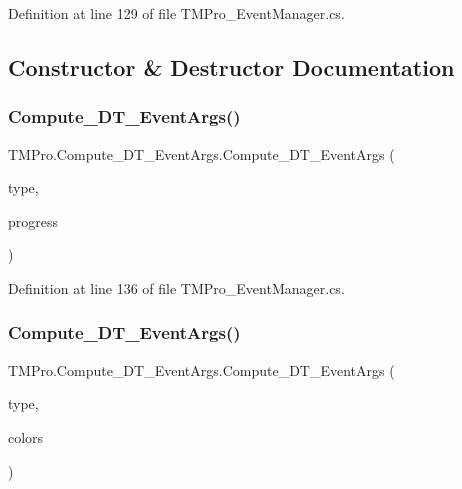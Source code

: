 Definition at line 129 of file T\+M\+Pro\+\_\+\+Event\+Manager.\+cs.



\subsection{Constructor \& Destructor Documentation}
\mbox{\label{class_t_m_pro_1_1_compute___d_t___event_args_ad8c2efb977ea8e6e15815ced2257af5d}} 
\subsubsection{\texorpdfstring{Compute\_DT\_EventArgs()}{Compute\_DT\_EventArgs()}\hspace{0.1cm}{\footnotesize\ttfamily [1/2]}}
{\footnotesize\ttfamily T\+M\+Pro.\+Compute\+\_\+\+D\+T\+\_\+\+Event\+Args.\+Compute\+\_\+\+D\+T\+\_\+\+Event\+Args (\begin{DoxyParamCaption}\item[{\mbox{\hyperlink{namespace_t_m_pro_af6aadc6d9f8a76a743cd456760e57316}{Compute\+\_\+\+Distance\+Transform\+\_\+\+Event\+Types}}}]{type,  }\item[{float}]{progress }\end{DoxyParamCaption})}



Definition at line 136 of file T\+M\+Pro\+\_\+\+Event\+Manager.\+cs.

\mbox{\label{class_t_m_pro_1_1_compute___d_t___event_args_aeb19de7c5ec823f91a81ebf58358ee76}} 
\subsubsection{\texorpdfstring{Compute\_DT\_EventArgs()}{Compute\_DT\_EventArgs()}\hspace{0.1cm}{\footnotesize\ttfamily [2/2]}}
{\footnotesize\ttfamily T\+M\+Pro.\+Compute\+\_\+\+D\+T\+\_\+\+Event\+Args.\+Compute\+\_\+\+D\+T\+\_\+\+Event\+Args (\begin{DoxyParamCaption}\item[{\mbox{\hyperlink{namespace_t_m_pro_af6aadc6d9f8a76a743cd456760e57316}{Compute\+\_\+\+Distance\+Transform\+\_\+\+Event\+Types}}}]{type,  }\item[{Color \mbox{[}$\,$\mbox{]}}]{colors }\end{DoxyParamCaption})}



